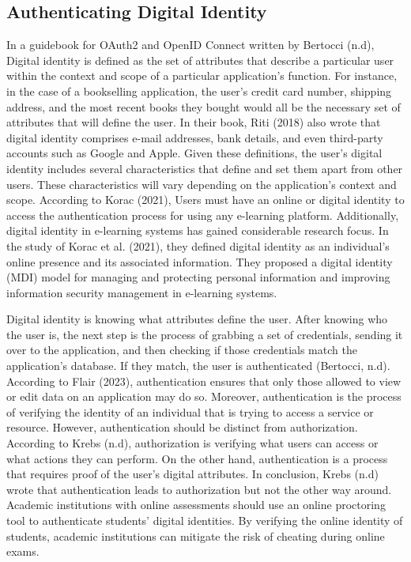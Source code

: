 \documentclass{icsthesis}
\begin{document}
\begin{mainmatter}
\subsection{Authenticating Digital Identity}
In a guidebook for OAuth2 and OpenID Connect written by Bertocci (n.d), Digital identity is defined as the set of attributes that describe a particular user within the context and scope of a particular application's function. For instance, in the case of a bookselling application, the user's credit card number, shipping address, and the most recent books they bought would all be the necessary set of attributes that will define the user. In their book, Riti (2018) also wrote that digital identity comprises e-mail addresses, bank details, and even third-party accounts such as Google and Apple. Given these definitions, the user's digital identity includes several characteristics that define and set them apart from other users. These characteristics will vary depending on the application's context and scope. According to Korac (2021), Users must have an online or digital identity to access the authentication process for using any e-learning platform. Additionally, digital identity in e-learning systems has gained considerable research focus. In the study of Korac et al. (2021), they defined digital identity as an individual's online presence and its associated information. They proposed a digital identity (MDI) model for managing and protecting personal information and improving information security management in e-learning systems.

\setlength{\parindent}{13pt}Digital identity is knowing what attributes define the user. After knowing who the user is, the next step is the process of grabbing a set of credentials, sending it over to the application, and then checking if those credentials match the application's database. If they match, the user is authenticated (Bertocci, n.d). According to Flair (2023), authentication ensures that only those allowed to view or edit data on an application may do so. Moreover, authentication is the process of verifying the identity of an individual that is trying to access a service or resource. However, authentication should be distinct from authorization. According to Krebs (n.d), authorization is verifying what users can access or what actions they can perform. On the other hand, authentication is a process that requires proof of the user's digital attributes. In conclusion, Krebs (n.d) wrote that authentication leads to authorization but not the other way around. Academic institutions with online assessments should use an online proctoring tool to authenticate students' digital identities. By verifying the online identity of students, academic institutions can mitigate the risk of cheating during online exams.\\


\end{mainmatter}
\end{document}
